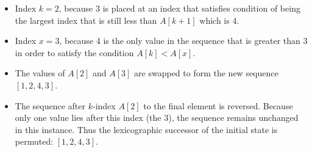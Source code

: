 \begin{itemize}
\item Index $k = 2$, because 3 is placed at an index that satisfies condition of being the largest index that is still less than $A[k + 1]$ which is 4.
\item Index $x = 3$, because 4 is the only value in the sequence that is greater than 3 in order to satisfy the condition $A[k] < A[x]$.
\item The values of $A[2]$ and $A[3]$ are swapped to form the new sequence $[1,2,4,3]$.
\item The sequence after $k$-index $A[2]$ to the final element is reversed. Because only one value lies after this index (the 3), the sequence remains unchanged in this instance. Thus the lexicographic successor of the initial state is permuted: $[1,2,4,3]$.
\end{itemize}

